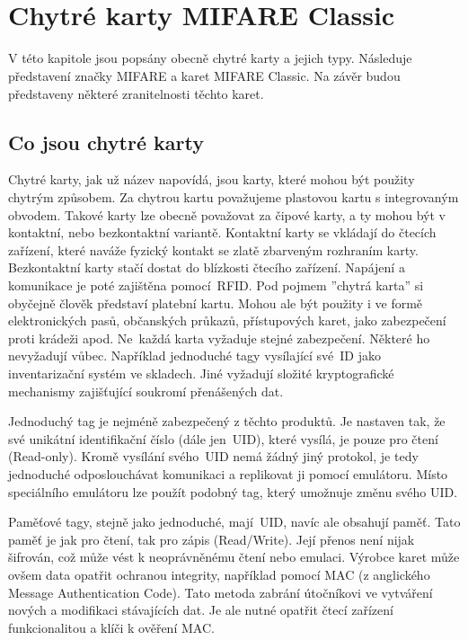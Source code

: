 \chapter{Chytré karty MIFARE Classic\textsuperscript{\textregistered}}
\label{chytre_karty}
V této kapitole jsou popsány obecně chytré karty a jejich typy. Následuje představení značky MIFARE a karet MIFARE Classic. Na závěr budou představeny některé zranitelnosti těchto karet.

\section{Co jsou chytré karty}
Chytré karty, jak už název napovídá, jsou karty, které mohou být použity chytrým způsobem. Za chytrou kartu považujeme plastovou kartu s integrovaným obvodem. Takové karty lze obecně považovat za čipové karty, a ty mohou být v kontaktní, nebo bezkontaktní variantě. Kontaktní karty se vkládají do čtecích zařízení, které naváže fyzický kontakt se zlatě zbarveným rozhraním karty. Bezkontaktní karty stačí dostat do blízkosti čtecího zařízení. Napájení a komunikace je poté zajištěna pomocí~RFID. Pod pojmem ''chytrá karta'' si obyčejně člověk představí platební kartu. Mohou ale být použity i ve formě elektronických pasů, občanských průkazů, přístupových karet, jako zabezpečení proti krádeži apod. Ne~každá karta vyžaduje stejné zabezpečení. Některé ho nevyžadují vůbec. Například jednoduché tagy vysílající své~ID jako inventarizační systém ve skladech. Jiné vyžadují složité  kryptografické mechanismy zajišťující soukromí přenášených dat. 
\par
Jednoduchý tag je nejméně zabezpečený z těchto produktů. Je nastaven tak, že své unikátní identifikační číslo (dále jen~UID), které vysílá, je pouze pro čtení {(Read-only)}. Kromě vysílání svého~UID nemá žádný jiný protokol, je tedy jednoduché odposlouchávat komunikaci a replikovat ji pomocí emulátoru. Místo speciálního emulátoru lze použít podobný tag, který umožnuje změnu svého UID.
\par
Paměťové tagy, stejně jako jednoduché, mají~UID, navíc ale obsahují paměť. Tato paměť je jak pro čtení, tak pro zápis {(Read/Write)}. Její přenos není nijak šifrován, což může vést k neoprávněnému čtení nebo emulaci. Výrobce karet může ovšem data opatřit ochranou integrity, například pomocí MAC (z anglického Message Authentication Code). Tato metoda zabrání útočníkovi ve vytváření nových a modifikaci stávajících dat. Je ale nutné opatřit čtecí zařízení funkcionalitou a klíči k ověření MAC\cite{Mifare_Classic_story}.
